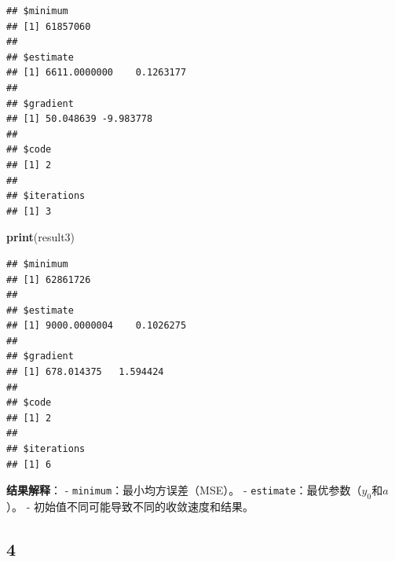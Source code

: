 \documentclass[
]{article}
\newenvironment{Shaded}{\begin{snugshade}}{\end{snugshade}}
\newcommand{\AttributeTok}[1]{\textcolor[rgb]{0.13,0.29,0.53}{#1}}
\newcommand{\ControlFlowTok}[1]{\textcolor[rgb]{0.13,0.29,0.53}{\textbf{#1}}}
\newcommand{\DecValTok}[1]{\textcolor[rgb]{0.00,0.00,0.81}{#1}}
\newcommand{\FloatTok}[1]{\textcolor[rgb]{0.00,0.00,0.81}{#1}}
\newcommand{\FunctionTok}[1]{\textcolor[rgb]{0.13,0.29,0.53}{\textbf{#1}}}
\newcommand{\NormalTok}[1]{#1}
\newcommand{\OtherTok}[1]{\textcolor[rgb]{0.56,0.35,0.01}{#1}}
\newcommand{\SpecialCharTok}[1]{\textcolor[rgb]{0.81,0.36,0.00}{\textbf{#1}}}
\begin{document}
\begin{verbatim}
## $minimum
## [1] 61857060
## 
## $estimate
## [1] 6611.0000000    0.1263177
## 
## $gradient
## [1] 50.048639 -9.983778
## 
## $code
## [1] 2
## 
## $iterations
## [1] 3
\end{verbatim}

\begin{Shaded}
\begin{Highlighting}[]
\FunctionTok{print}\NormalTok{(result3)}
\end{Highlighting}
\end{Shaded}

\begin{verbatim}
## $minimum
## [1] 62861726
## 
## $estimate
## [1] 9000.0000004    0.1026275
## 
## $gradient
## [1] 678.014375   1.594424
## 
## $code
## [1] 2
## 
## $iterations
## [1] 6
\end{verbatim}

\textbf{结果解释}： - \texttt{minimum}：最小均方误差（MSE）。 -
\texttt{estimate}：最优参数（\(y_0\)和\(a\)）。 -
初始值不同可能导致不同的收敛速度和结果。

\subsection{4}\label{section-3}

\begin{Shaded}
\end{Shaded}
\end{document}
